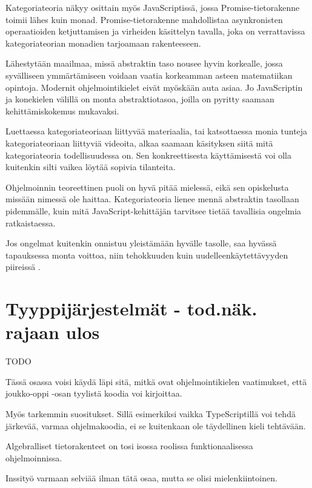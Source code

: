 Kategoriateoria näkyy osittain myös JavaScriptissä, jossa Promise-tietorakenne toimii lähes kuin \gls{monad}. Promise-tietorakenne mahdollistaa asynkronisten operaatioiden ketjuttamisen ja virheiden käsittelyn tavalla, joka on verrattavissa kategoriateorian monadien tarjoamaan rakenteeseen. \citep{promises-spec-94,stackoverflow:why_monad}


Lähestytään maailmaa, missä abstraktin taso nousee hyvin korkealle, jossa syvälliseen ymmärtämiseen voidaan vaatia korkeamman asteen matematiikan opintoja. Modernit ohjelmointikielet eivät myöskään auta asiaa. Jo JavaScriptin ja konekielen välillä on monta abstraktiotasoa, joilla on pyritty saamaan kehittämiskokemus mukavaksi.

Luettaessa kategoriateoriaan liittyvää materiaalia, tai katsottaessa monia tunteja kategoriateoriaan liittyviä videoita, alkaa saamaan käsityksen siitä mitä kategoriateoria todellisuudessa on. Sen konkreettisesta käyttämisestä voi olla kuitenkin silti vaikea löytää sopivia tilanteita.

Ohjelmoinnin teoreettinen puoli on hyvä pitää mielessä, eikä sen opiskelusta missään nimessä ole haittaa. Kategoriateoria lienee mennä abstraktin tasollaan pidemmälle, kuin mitä JavaScript-kehittäjän tarvitsee tietää tavallisia ongelmia ratkaistaessa.

Jos ongelmat kuitenkin onnistuu yleistämään hyvälle tasolle, saa hyvässä tapauksessa monta voittoa, niin tehokkuuden kuin uudelleenkäytettävyyden piireissä \cite{clojure_compiler,bartosz_category_for_progamers,dijkstra_humble_programmer}.


\section{Tyyppijärjestelmät - tod.näk. rajaan ulos}

TODO

Tässä osassa voisi käydä läpi sitä, mitkä ovat ohjelmointikielen vaatimukset, että joukko-oppi -osan tyylistä koodia voi kirjoittaa.

Myös tarkemmin suositukset. Sillä esimerkiksi vaikka TypeScriptillä voi tehdä järkevää, varmaa ohjelmakoodia, ei se kuitenkaan ole täydellinen kieli tehtävään.

Algebralliset tietorakenteet on tosi isossa roolissa funktionaalisessa ohjelmoinnissa.

Inssityö varmaan selviää ilman tätä osaa, mutta se olisi mielenkiintoinen.


